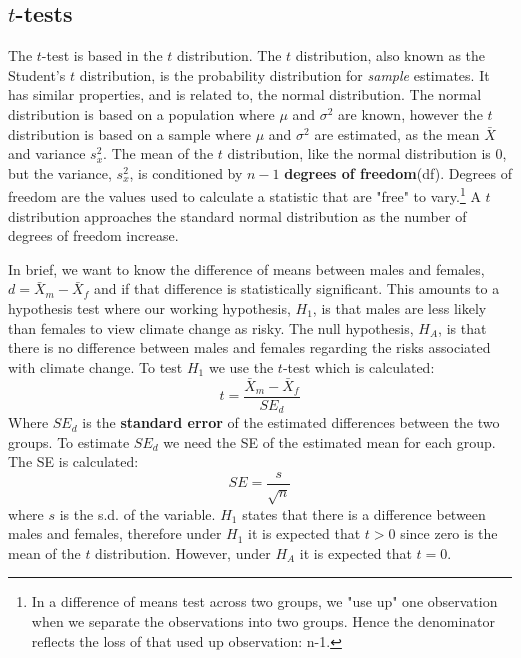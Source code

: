 \documentclass[11pt,openany]{book}\usepackage[]{graphicx}\usepackage[]{color}
\begin{document}
{\subsection{$t$-tests} 

The $t$-test is based in the $t$ distribution. The $t$ distribution, also known as the Student's $t$ distribution, is the probability 
distribution for \textit{sample} estimates. It has similar properties, and is related to, the normal distribution. The normal distribution is
based on a population where $\mu$ and $\sigma^2$ are known, however the $t$ distribution is based on a sample where $\mu$ and $\sigma^2$
are estimated, as the mean $\bar{X}$ and variance $s^2_x$. The mean of the $t$ distribution, like the normal distribution is $0$, but the
variance, $s^2_x$, is conditioned by $n-1$ \textbf{degrees of freedom}(df). Degrees of freedom are the values used to calculate a statistic that are "free" to vary.\footnote{In a difference of means test across two groups, we "use up" one observation when we separate the observations into two groups. Hence the denominator reflects the loss of that used up observation: n-1.} A $t$ distribution approaches the standard normal distribution as the number of degrees of freedom increase.

In brief, we want to know the difference of means between males and females, $d = \bar{X}_m-\bar{X}_f$ and if that difference is statistically
significant. This amounts to a hypothesis test where our working hypothesis, $H_1$, is that males are less likely than females to view climate
change as risky. The null hypothesis, $H_A$, is that there is no difference between males and females regarding the risks associated with climate
change. To test $H_1$ we use the $t$-test which is calculated: 
\begin{equation}
  \label{eq:t}
  t = \frac{\bar{X}_m-\bar{X}_f}{SE_d}
\end{equation}
\noindent Where $SE_d$ is the \textbf{standard error} of the estimated differences between the two groups.  To estimate $SE_d$ we need the SE of the estimated mean for each group. The SE is calculated: 
\begin{equation}
  \label{eq:se}
  SE = \frac{s}{\sqrt{n}}
\end{equation}
\noindent where $s$ is the s.d. of the variable. $H_1$ states that there is a difference between males and females, therefore under $H_1$ it is expected that $t > 0$ since zero is the mean of the $t$ distribution. However, under $H_A$ it is expected that $t = 0$. 

}
\end{document}
